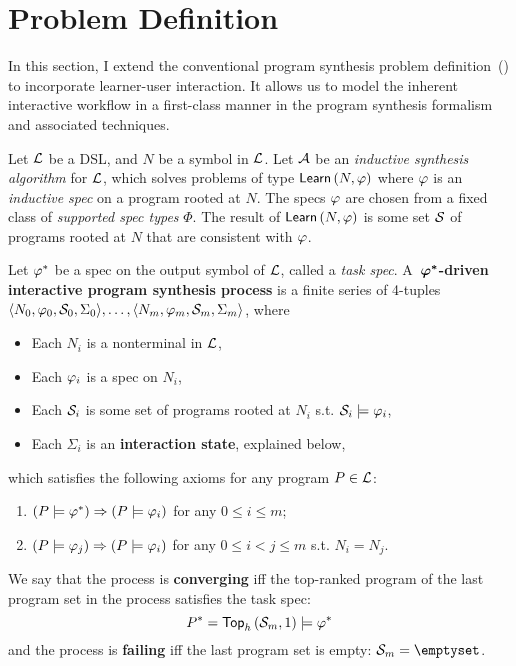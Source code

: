 \section{Problem Definition}
\label{sec:interactive:problem}

In this section, I extend the conventional program synthesis problem definition~() to
incorporate learner-user interaction.
It allows us to model the inherent interactive workflow in a first-class manner in the program synthesis formalism and
associated techniques.

\begin{problem}
    Let $\mathcal{L}$ be a DSL, and $N$ be a symbol in $\mathcal{L}$.
    Let $\mathcal{A}$ be an \emph{inductive synthesis algorithm} for $\mathcal{L}$, which solves problems of type
    $\mathsf{Learn}\left(N, \varphi\right)$ where $\varphi$ is an \emph{inductive spec} on a program rooted at $N$.
    The specs $\varphi$ are chosen from a fixed class of \emph{supported spec types} $\Phi$.
    The result of $\mathsf{Learn}\left(N, \varphi\right)$ is some set $\mathcal{S}$ of programs rooted at $N$ that are consistent
    with $\varphi$.

    Let $\varphi^{*}$ be a spec on the output symbol of $\mathcal{L}$, called a \emph{task spec}.
    A~\textbf{$\bm{\varphi^{*}}$-driven interactive program synthesis process} is a finite series of 4-tuples
    $\langle N_0, \varphi_0, \mathcal{S}_0, \Sigma_0\rangle, \dots, \langle N_m, \varphi_m, \mathcal{S}_m, \Sigma_m\rangle$, where
    \begin{itemize}[nosep]
        \item Each $N_i$ is a nonterminal in $\mathcal{L}$,
        \item Each $\varphi_i$ is a spec on $N_i$,
        \item Each $\mathcal{S}_i$ is some set of programs rooted at $N_i$ s.t. $\mathcal{S}_i \models \varphi_i$,
        \item Each $\Sigma_i$ is an \textbf{interaction state}, explained below,
    \end{itemize}
    which satisfies the following axioms for any program $P \in \mathcal{L}$:
    \begin{enumerate}[nosep, label=\textbf{\Alph*.}]
        \item $(P \models \varphi^{*}) \Rightarrow (P \models \varphi_i)$ for any $0 \le i \le m$;
        \item $(P \models \varphi_j) \Rightarrow (P \models \varphi_i)$ for any $0 \le i < j \le m$ s.t. $N_i = N_j$.
    \end{enumerate}
    We say that the process is \textbf{converging} iff the top-ranked program of the last program set in the process
    satisfies the task spec:
    \[
        P^{*} = \mathsf{Top}_h\left(\mathcal{S}_m, 1\right) \models \varphi^{*}
    \]
    and the process is \textbf{failing} iff the last program set is empty: $\vsa_m = \emptyset$.


\end{problem}
